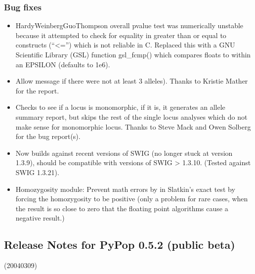 \documentclass[letterpaper,10pt,english,openany,oneside]{sphinxmanual}
\begin{document}
\subsubsection{Bug fixes}
\label{\detokenize{docs/guide-chapter-changes:id3}}\begin{itemize}
\item {} 
\sphinxAtStartPar
HardyWeinbergGuoThompson overall p\sphinxhyphen{}value test was numerically unstable
because it attempted to check for equality in greater than or
equal to constructs (“\textless{}=”) which is not reliable in C.  Replaced
this with a GNU Scientific Library (GSL) function gsl\_fcmp() which
compares floats to within an EPSILON (defaults to 1e\sphinxhyphen{}6).

\item {} 
\sphinxAtStartPar
Allow 
message if there were not at least 3 alleles).  Thanks to Kristie
Mather for the report.

\item {} 
\sphinxAtStartPar
Checks to see if a locus is monomorphic, if it is, it generates an
allele summary report, but skips the rest of the single locus
analyses which do not make sense for monomorphic locus.  Thanks to
Steve Mack and Owen Solberg for the bug report(s).

\item {} 
\sphinxAtStartPar
Now builds against recent versions of SWIG (no longer stuck at version
1.3.9), should be compatible with versions of SWIG \textgreater{} 1.3.10.
(Tested against SWIG 1.3.21).

\item {} 
\sphinxAtStartPar
Homozygosity module: Prevent math errors by in Slatkin’s exact test by
forcing the homozygosity to be positive (only a problem for rare
cases, when the result is so close to zero that the floating point
algorithms cause a negative result.)

\end{itemize}


\subsection{Release Notes for PyPop 0.5.2 (public beta)}
\label{\detokenize{docs/guide-chapter-changes:release-notes-for-pypop-0-5-2-public-beta}}
\sphinxAtStartPar
(2004\sphinxhyphen{}03\sphinxhyphen{}09)
\end{document}
